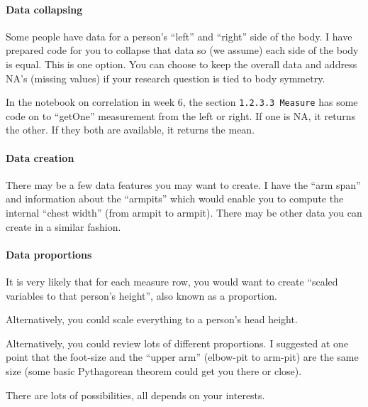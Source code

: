 \documentclass[]{article}
\begin{document}
\hypertarget{data-collapsing}{%
\paragraph{Data collapsing}\label{data-collapsing}}

Some people have data for a person's ``left'' and ``right'' side of the
body. I have prepared code for you to collapse that data so (we assume)
each side of the body is equal. This is one option. You can choose to
keep the overall data and address NA's (missing values) if your research
question is tied to body symmetry.

In the notebook on correlation in week 6, the section
\texttt{1.2.3.3\ Measure} has some code on to ``getOne'' measurement
from the left or right. If one is NA, it returns the other. If they both
are available, it returns the mean.

\hypertarget{data-creation}{%
\paragraph{Data creation}\label{data-creation}}

There may be a few data features you may want to create. I have the
``arm span'' and information about the ``armpits'' which would enable
you to compute the internal ``chest width'' (from armpit to armpit).
There may be other data you can create in a similar fashion.

\hypertarget{data-proportions}{%
\paragraph{Data proportions}\label{data-proportions}}

It is very likely that for each measure row, you would want to create
``scaled variables to that person's height'', also known as a
proportion.

Alternatively, you could scale everything to a person's head height.

Alternatively, you could review lots of different proportions. I
suggested at one point that the foot-size and the ``upper arm''
(elbow-pit to arm-pit) are the same size (some basic Pythagorean theorem
could get you there or close).

There are lots of possibilities, all depends on your interests.
\end{document}
